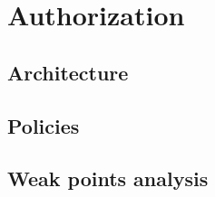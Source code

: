 \chapter{Authorization}
\minitoc

\section{Architecture}

\section{Policies}

\section{Weak points analysis}